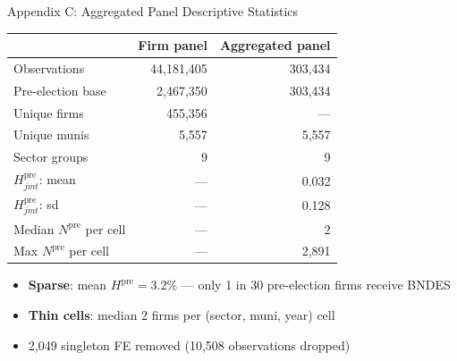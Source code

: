 \documentclass[aspectratio=169,11pt]{beamer}
\begin{document}
\begin{frame}{Appendix C: Aggregated Panel Descriptive Statistics}

\begin{center}
\small
\begin{tabular}{lrr}
\toprule
& \textbf{Firm panel} & \textbf{Aggregated panel} \\
\midrule
Observations      & 44,181,405 & 303,434 \\
Pre-election base & 2,467,350  & 303,434 \\
Unique firms      & 455,356    & --- \\
Unique munis      & 5,557      & 5,557 \\
Sector groups     & 9          & 9 \\
\midrule
$H^{\mathrm{pre}}_{jmt}$: mean & --- & 0.032 \\
$H^{\mathrm{pre}}_{jmt}$: sd   & --- & 0.128 \\
Median $N^{\mathrm{pre}}$ per cell & --- & 2 \\
Max $N^{\mathrm{pre}}$ per cell    & --- & 2,891 \\
\bottomrule
\end{tabular}
\end{center}

\medskip

\begin{itemize}\setlength{\itemsep}{2pt}
    \item \textbf{Sparse}: mean $H^{\mathrm{pre}} = 3.2\%$ --- only 1 in 30 pre-election firms receive BNDES
    \item \textbf{Thin cells}: median 2 firms per (sector, muni, year) cell
    \item 2,049 singleton FE removed (10,508 observations dropped)
\end{itemize}

\end{frame}
\end{document}
